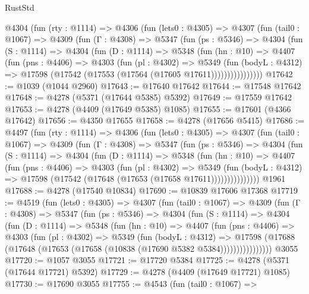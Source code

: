 \begin{lexlean}{RustStd}
\begin{coremodule}
{\begin{coremodule}
{{{{{{{{{{{{{{{{{{{{{{{{{{{{{{{{{{{    @4304
      (fun (rty : @1114) =>
      @4306
        (fun (lets0 : @4305) =>
        @4307
          (fun (tail0 : @1067) =>
          @4309
            (fun (Γ : @4308) =>
            @5347
              (fun (ps : @5346) =>
              @4304
                (fun (S : @1114) =>
                @4304
                  (fun (D : @1114) =>
                  @5348
                    (fun (hn : @10) =>
                    @4407
                      (fun (pns : @4406) =>
                      @4303
                        (fun (pl : @4302) =>
                        @5349
                          (fun (bodyL : @4312) =>
                          @17598 (@17542 (@17553 (@17564 (@17605 @17611))))))))))))))))
@17642 := @1039 (@1044 @2960)
@17643 := @17640 @17642
@17644 := @17548 @17642
@17648 := @4278 (@5371 (@17644 @5385) @5392)
@17649 := @17559 @17642
@17653 := @4278 (@4409 (@17649 @5385) @1085)
@17655 := @17601 (@4366 @17642)
@17656 := @4350 @17655
@17658 := @4278 (@17656 @5415)
@17686 := @4497
    (fun (rty : @1114) =>
    @4306
      (fun (lets0 : @4305) =>
      @4307
        (fun (tail0 : @1067) =>
        @4309
          (fun (Γ : @4308) =>
          @5347
            (fun (ps : @5346) =>
            @4304
              (fun (S : @1114) =>
              @4304
                (fun (D : @1114) =>
                @5348
                  (fun (hn : @10) =>
                  @4407
                    (fun (pns : @4406) =>
                    @4303
                      (fun (pl : @4302) =>
                      @5349
                        (fun (bodyL : @4312) =>
                        @17598 (@17542 (@17648 (@17653 (@17658 @17611)))))))))))))))
    @1961
@17688 := @4278 (@17540 @10834)
@17690 := @10839 @17606 @17368
@17719 := @4519
    (fun (lets0 : @4305) =>
    @4307
      (fun (tail0 : @1067) =>
      @4309
        (fun (Γ : @4308) =>
        @5347
          (fun (ps : @5346) =>
          @4304
            (fun (S : @1114) =>
            @4304
              (fun (D : @1114) =>
              @5348
                (fun (hn : @10) =>
                @4407
                  (fun (pns : @4406) =>
                  @4303
                    (fun (pl : @4302) =>
                    @5349
                      (fun (bodyL : @4312) =>
                      @17598
                        (@17688 (@17648 (@17653 (@17658 (@10838 (@17690 @5382 @5384))))))))))))))))
    @3055
@17720 := @1057 @3055
@17721 := @17720 @5384
@17725 := @4278 (@5371 (@17644 @17721) @5392)
@17729 := @4278 (@4409 (@17649 @17721) @1085)
@17730 := @17690 @3055
@17755 := @4543
    (fun (tail0 : @1067) =>
}}}}}}}}}}}}}}}}}}}}}}}}}}}}}}}}}}}
\end{coremodule}}
\end{coremodule}
\end{lexlean}
